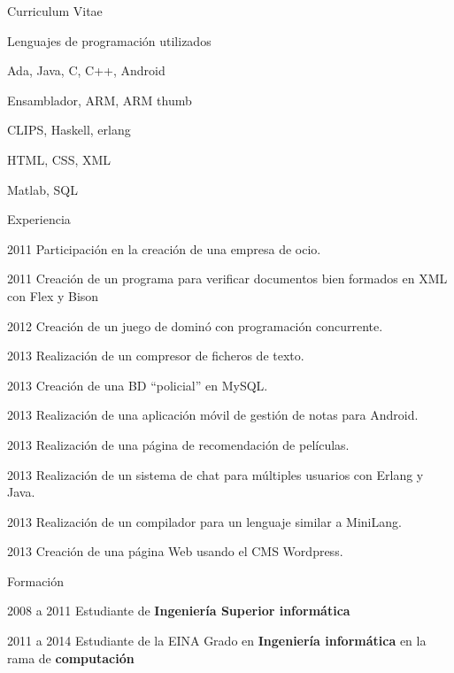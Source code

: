\begin{cv}{Curriculum Vitae}

\begin{cvlist}{Lenguajes de programación utilizados}
\item Ada, Java, C, C++, Android
\item Ensamblador, ARM, ARM thumb
\item CLIPS, Haskell, erlang
\item HTML, CSS, XML
\item Matlab, SQL
\end{cvlist}

\begin{cvlist}{Experiencia}

	\item[2011] Participación en la creación de una empresa de ocio.
	\item[2011] Creación de un programa para verificar documentos bien formados en XML con Flex y Bison
	\item[2012] Creación de un juego de dominó con programación concurrente.
	\item[2013] Realización de un compresor de ficheros de texto.
	\item[2013] Creación de una BD ``policial'' en MySQL.
	\item[2013] Realización de una aplicación móvil de gestión de notas para Android.
	\item[2013] Realización de una página de recomendación de películas.
	\item[2013] Realización de un sistema de chat para múltiples usuarios con Erlang y Java.
	\item[2013] Realización de un compilador para un lenguaje similar a MiniLang.
	\item[2013] Creación de una página Web usando el CMS Wordpress.

\end{cvlist}

\begin{cvlist}{Formación}

	\item[2008 a 2011] Estudiante de \textbf{Ingeniería Superior informática}
	\item[2011 a 2014] Estudiante de la EINA
		Grado en \textbf{Ingeniería informática} en la rama de \textbf{computación}


\end{cvlist}

\end{cv}